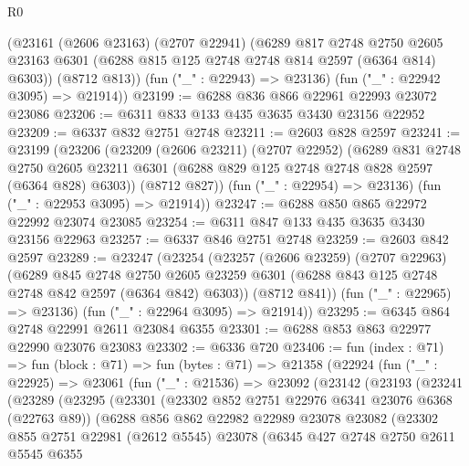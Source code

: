 \begin{lexlean}{R0}
\begin{coremodule}
      (@23161
        (@2606 @23163)
        (@2707 @22941)
        (@6289
          @817
          @2748
          @2750
          @2605
          @23163
          @6301
          (@6288 @815 @125 @2748 @2748 @814 @2597 (@6364 @814) @6303))
        (@8712 @813))
      (fun ("_" : @22943) => @23136)
      (fun ("_" : @22942 @3095) => @21914))
@23199 := @6288 @836 @866 @22961 @22993 @23072 @23086
@23206 := @6311 @833 @133 @435 @3635 @3430 @23156 @22952
@23209 := @6337 @832 @2751 @2748
@23211 := @2603 @828 @2597
@23241 := @23199
    (@23206
      (@23209
        (@2606 @23211)
        (@2707 @22952)
        (@6289
          @831
          @2748
          @2750
          @2605
          @23211
          @6301
          (@6288 @829 @125 @2748 @2748 @828 @2597 (@6364 @828) @6303))
        (@8712 @827))
      (fun ("_" : @22954) => @23136)
      (fun ("_" : @22953 @3095) => @21914))
@23247 := @6288 @850 @865 @22972 @22992 @23074 @23085
@23254 := @6311 @847 @133 @435 @3635 @3430 @23156 @22963
@23257 := @6337 @846 @2751 @2748
@23259 := @2603 @842 @2597
@23289 := @23247
    (@23254
      (@23257
        (@2606 @23259)
        (@2707 @22963)
        (@6289
          @845
          @2748
          @2750
          @2605
          @23259
          @6301
          (@6288 @843 @125 @2748 @2748 @842 @2597 (@6364 @842) @6303))
        (@8712 @841))
      (fun ("_" : @22965) => @23136)
      (fun ("_" : @22964 @3095) => @21914))
@23295 := @6345 @864 @2748 @22991 @2611 @23084 @6355
@23301 := @6288 @853 @863 @22977 @22990 @23076 @23083
@23302 := @6336 @720
@23406 := fun (index : @71) =>
  fun (block : @71) =>
  fun (bytes : @71) =>
  @21358
    (@22924
      (fun ("_" : @22925) =>
      @23061
        (fun ("_" : @21536) =>
        @23092
          (@23142
            (@23193
              (@23241
                (@23289
                  (@23295
                    (@23301
                      (@23302 @852 @2751 @22976 @6341 @23076 @6368 (@22763 @89))
                      (@6288
                        @856
                        @862
                        @22982
                        @22989
                        @23078
                        @23082
                        (@23302
                          @855
                          @2751
                          @22981
                          (@2612 @5545)
                          @23078
                          (@6345
                            @427
                            @2748
                            @2750
                            @2611
                            @5545
                            @6355

\end{coremodule}
\end{lexlean}
